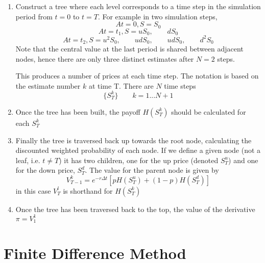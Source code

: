 \begin{enumerate}
	\item Construct a tree where each level corresponds to a time step in the simulation period from $t=0$ to $t=T$. For example in two simulation steps, 
	\begin{equation}
		At = 0, S = S_0
	\end{equation}
	\begin{equation}
		At = t_1, S = uS_0,\qquad dS_0
	\end{equation}
	\begin{equation}
		At = t_2, S = u^2S_0,\qquad udS_0,\qquad udS_0,\qquad d^2S_0
	\end{equation}
	Note that the central value at the last period is shared between adjacent nodes, hence there are only three distinct estimates after $N=2$ steps.
	
	This produces a number of prices at each time step. The notation is based on the estimate number $k$ at time T. There are $N$ time steps
	\begin{equation}
		\{S_T^k\}\qquad k=1...N+1
	\end{equation}
	
	\item Once the tree has been built, the payoff $H(S_T^k)$ should be calculated for each $S_T^k$
	
	\item Finally the tree is traversed back up towards the root node, calculating the discounted weighted probability of each node. If we define a given node (not a leaf, i.e. $t\neq T$) it has two children, one for the up price (denoted $S_T^u$) and one for the down price, $S_T^d$. The value for the parent node is given by 
	\begin{equation}
	V_{T-1}^k = e^{-r\Delta{}t}[pH(S_T^u) + (1-p)H(S_T^d)]
	\end{equation}
	in this case $V_T^l$ is shorthand for $H(S_T^k)$
	
	\item Once the tree has been traversed back to the top, the value of the derivative $\pi=V_1^1$
\end{enumerate}


\section{Finite Difference Method}

